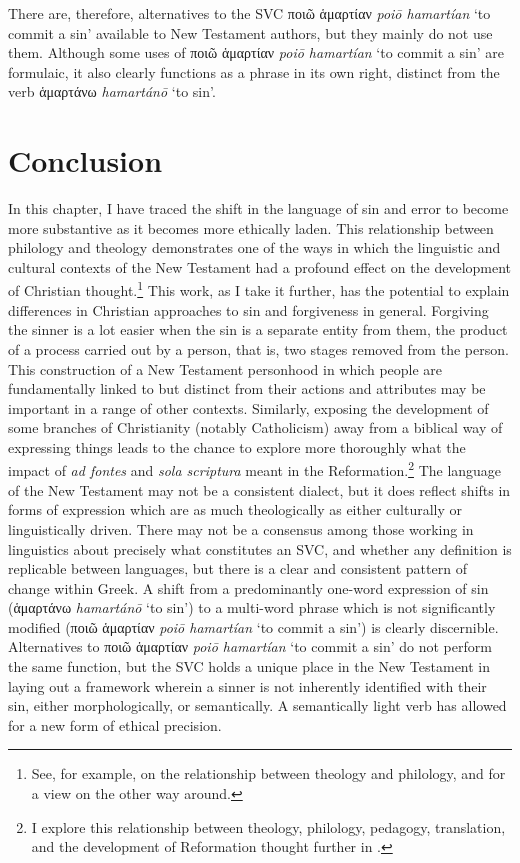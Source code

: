 \documentclass[output=paper,colorlinks,citecolor=brown]{langscibook}
\begin{document}
There are, therefore, alternatives to the SVC ποιῶ ἁμαρτίαν \textit{poiō hamartían} ‘to commit a sin' available to
New Testament authors, but they mainly do not use them. 
Although some
uses of ποιῶ ἁμαρτίαν \textit{poiō hamartían} ‘to commit a sin' are formulaic, it also clearly functions as a
phrase in its own right, distinct from the verb ἁμαρτάνω \textit{hamartánō} ‘to sin'.

\hypertarget{conclusion}{%
\section{Conclusion}\label{conclusionCR}}

In this chapter, I have traced the shift in the language of sin and error
to become more substantive as it becomes more ethically laden. This
relationship between philology and theology demonstrates one of the ways
in which the linguistic and cultural contexts of the New Testament had a
profound effect on the development of Christian thought.\footnote{See,
  for example, \citet{atkinson_theology_1944, wallace_greek_1996, hart_new_2017} on the
  relationship between theology and philology, and \citet{conybeare_classical_2021} for a view on the other way around.} This work, as I
take it further, has the potential to explain differences in Christian
approaches to sin and forgiveness in general. 
Forgiving the sinner is a
lot easier when the sin is a separate entity from them, the product of a
process carried out by a person, that is, two stages removed from the
person. 
This construction of a New Testament personhood in which people
are fundamentally linked to but distinct from their actions and
attributes may be important in a range of other contexts. 
Similarly,
exposing the development of some branches of Christianity (notably
Catholicism) away from a biblical way of expressing things leads to the
chance to explore more thoroughly what the impact of \emph{ad fontes}
and \emph{sola scriptura} meant in the Reformation.\footnote{I explore
  this relationship between theology, philology, pedagogy, translation,
  and the development of Reformation thought further in \citet{ryan_translating_2025}.}
The language of the New Testament may not be a consistent dialect, but
it does reflect shifts in forms of expression which are as much
theologically as either culturally or linguistically driven. 
There may
not be a consensus among those working in linguistics about precisely
what constitutes an SVC, and whether any definition is replicable
between languages, but there is a clear and consistent pattern of change
within Greek. 
A shift from a predominantly one-word expression of sin
(ἁμαρτάνω \textit{hamartánō} ‘to sin') to a multi-word phrase which is not significantly modified
(ποιῶ ἁμαρτίαν \textit{poiō hamartían} ‘to commit a sin') is clearly discernible. Alternatives to ποιῶ ἁμαρτίαν \textit{poiō hamartían} ‘to commit a sin' do
not perform the same function, but the SVC holds a unique place in the
New Testament in laying out a framework wherein a sinner is not
inherently identified with their sin, either morphologically, or
semantically. 
A semantically light verb has allowed for a new form of
ethical precision.
\end{document}
